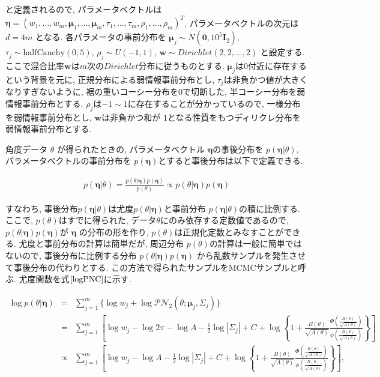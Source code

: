 \documentclass[a4paper,11pt]{jarticle}
\begin{document}
\noindent
と定義されるので, パラメータベクトルは$\bm \eta = (w_1, \dots, w_m, \bm \mu_1, \dots, \bm \mu_m, \tau_1, \dots, \tau_m, \rho_1, \dots, \rho_m)^T$, パラメータベクトルの次元は $d = 4m$ となる. 各パラメータの事前分布を $\bm \mu_j \sim N(\bm 0, 10^5 \bm I_2)$, $\tau_j \sim \mathrm{half Cauchy}(0,5)$, $\rho_j \sim U(-1,1)$, $\bm w \sim Dirichlet(2,2, \dots, 2)$ と設定する. ここで混合比率$\bm w$は$m$次の$Dirichlet$分布に従うものとする. $\bm \mu_j$は$0$付近に存在するという背景を元に, 正規分布による弱情報事前分布とし, $\tau_j$は非負かつ値が大きくなりすぎないように, 裾の重いコーシー分布を$0$で切断した, 半コーシー分布を弱情報事前分布とする. $\rho_j$は$-1 \sim 1$に存在することが分かっているので, 一様分布を弱情報事前分布とし, $\bm w$は非負かつ和が $1$となる性質をもつディリクレ分布を弱情報事前分布とする.

角度データ $\theta$ が得られたときの, パラメータベクトル $\bm \eta$の事後分布を $p(\bm \eta| \theta)$, パラメータベクトルの事前分布を $p(\bm \eta)$とすると事後分布は以下で定義できる. 

\begin{eqnarray*}
p(\bm \eta | \theta) = \frac{p(\theta | \bm \eta) p(\bm \eta)}{p(\theta)} \propto p(\theta | \bm \eta) p(\bm \eta)
\end{eqnarray*}

\noindent
すなわち, 事後分布$p(\bm \eta | \theta)$は尤度$p(\theta | \bm \eta)$と事前分布 $p(\bm \eta| \theta)$の積に比例する. ここで, $p(\theta)$はすでに得られた, データ$\theta$にのみ依存する定数値であるので, $p(\theta | \bm \eta) p(\bm \eta)$が $\bm \eta$ の分布の形を作り, $p(\theta)$は正規化定数とみなすことができる. 尤度と事前分布の計算は簡単だが, 周辺分布 $p(\theta)$の計算は一般に簡単ではないので, 事後分布に比例する分布 $p(\theta | \bm \eta) p(\bm \eta)$ から乱数サンプルを発生させて事後分布の代わりとする. この方法で得られたサンプルをMCMCサンプルと呼ぶ. 尤度関数を式$\ref{logPNC}$に示す. 

\footnotesize
\begin{eqnarray}
\label{logPNC}
\log p(\theta | \bm \eta) &=& \sum^m_{j=1} \{\log w_j + \log \mathcal{PN}_2(\theta;\bm \mu_j, \Sigma_j)\} \nonumber \\ 
&=& \sum^m_{j=1} \left[ \log w_j - \log 2\pi - \log A - \frac{1}{2} \log |\Sigma_j| + C + \log \left\{1 + \frac{B(\theta)}{\sqrt{A(\theta)}} \frac{\Phi \left(\frac{B(\theta)}{\sqrt{A(\theta)}}\right)}{\phi \left(\frac{B(\theta)}{\sqrt{A(\theta)}}\right)}\right\} \right] \nonumber \\
&\propto& \sum^m_{j=1} \left[ \log w_j - \log A - \frac{1}{2} \log |\Sigma_j| + C + \log \left\{1 + \frac{B(\theta)}{\sqrt{A(\theta)}} \frac{\Phi \left(\frac{B(\theta)}{\sqrt{A(\theta)}}\right)}{\phi \left(\frac{B(\theta)}{\sqrt{A(\theta)}}\right)}\right\} \right], 
\end{eqnarray}
\normalsize
\end{document}
